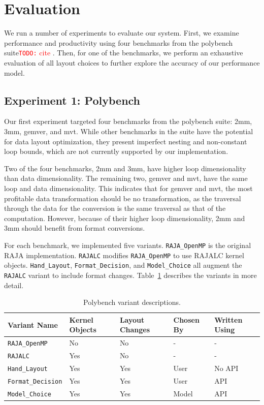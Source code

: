 \documentclass[sigconf, table]{acmart}
\newcommand{\todo}[1]{{\textcolor{red}{{\tt{TODO:}}\,\,#1 }}}
\newcommand{\nc}[0]{\todo{cite}}
\begin{document}
\section{Evaluation}

We run a number of experiments to evaluate our system. 
First, we examine performance and productivity using four benchmarks from the polybench suite\nc.
Then, for one of the benchmarks, we perform an exhaustive evaluation of all layout choices to further explore the accuracy of our performance model.

\subsection{Experiment 1: Polybench}

Our first experiment targeted four benchmarks from the polybench suite: 2mm, 3mm, gemver, and mvt.
While other benchmarks in the suite have the potential for data layout optimization, they present imperfect nesting and non-constant loop bounds, which are not currently supported by our implementation. 

Two of the four benchmarks, 2mm and 3mm, have higher loop dimensionality than data dimensionality. 
The remaining two, gemver and mvt, have the same loop and data dimensionality. 
This indicates that for gemver and mvt, the most profitable data transformation should be no transformation, as the traversal through the data for the conversion is the same traversal as that of the computation.
However, because of their higher loop dimensionality, 2mm and 3mm should benefit from format conversions.

For each benchmark, we implemented five variants.
\verb.RAJA_OpenMP. is the original RAJA implementation.
\verb.RAJALC. modifies \verb.RAJA_OpenMP. to use RAJALC kernel objects.
\verb.Hand_Layout., \verb.Format_Decision., and \verb.Model_Choice. all augment the \verb.RAJALC. variant to include format changes.
Table~\ref{VariantDescription} describes the variants in more detail.

\begin{table}
	\centering
	\begin{tabular}{ p{2.4cm} | p{1.1cm} | p{1.1cm} | p{1cm} | p{1cm}}
		Variant \linebreak Name & Kernel Objects & Layout Changes & Chosen \linebreak By & Written \linebreak Using \\
		\hline
		\verb.RAJA_OpenMP. & No & No & - & - \\
		\verb.RAJALC. & Yes & No & - & - \\
		\verb.Hand_Layout. & Yes & Yes & User & No API \\
		\verb.Format_Decision. & Yes & Yes & User & API \\
		\verb.Model_Choice. & Yes & Yes & Model & API
	\end{tabular}
	\caption{Polybench variant descriptions.}
	\label{VariantDescription}
\end{table}
\end{document}
